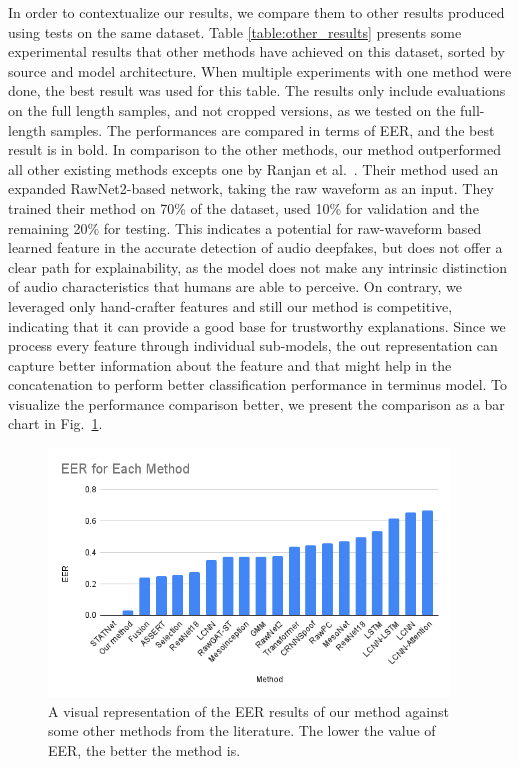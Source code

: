 \documentclass{article}
\begin{document}
In order to contextualize our results, we compare them to other results produced using tests on the same dataset. Table \ref{table:other_results} presents some experimental results that other methods have achieved on this dataset, sorted by source and model architecture. When multiple experiments with one method were done, the best result was used for this table. The results only include evaluations on the full length samples, and not cropped versions, as we tested on the full-length samples. The performances are compared in terms of EER, and the best result is in bold. In comparison to the other methods, our method outperformed all other existing methods excepts one by Ranjan et al.~\cite{ranjan_statnet_2022}. Their method used an expanded RawNet2-based network, taking the raw waveform as an input. They trained their method on 70\% of the dataset, used 10\% for validation and the remaining 20\% for testing. This indicates a potential for raw-waveform based learned feature in the accurate detection of audio deepfakes, but does not offer a clear path for explainability, as the model does not make any intrinsic distinction of audio characteristics that humans are able to perceive. On contrary, we leveraged only hand-crafter features and still our method is competitive, indicating that it can provide a good base for trustworthy explanations. Since we process every feature through individual sub-models, the out representation can capture better information about the feature and that might help in the concatenation to perform better classification performance in terminus model. To visualize the performance comparison better, we present the comparison as a bar chart in Fig.~\ref{comparison_bar}.

    \begin{figure}[htbp]
        \centering
        \includegraphics[width=0.95\textwidth]{images/method_comparison.png}
        \caption{A visual representation of the EER results of our method against some other methods from the literature. The lower the value of EER, the better the method is.}
        \label{comparison_bar}
    \end{figure}
\end{document}
